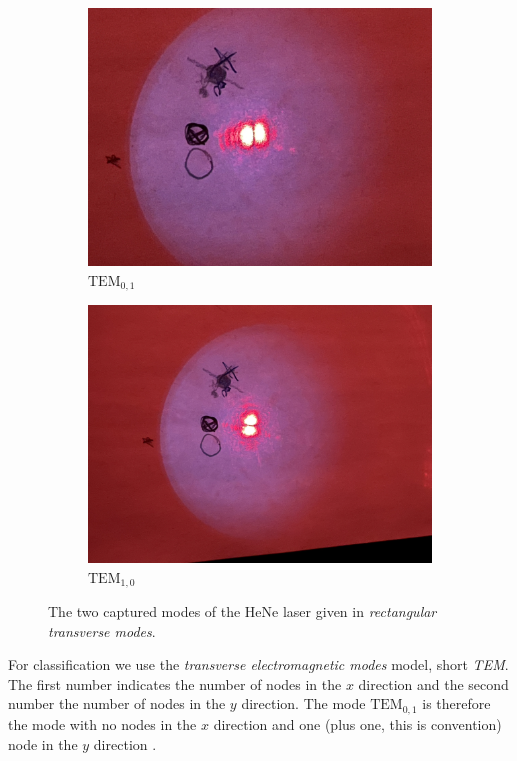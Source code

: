 \documentclass[../main.tex]{subfiles}
\begin{document}
    \begin{figure}[H]
        \centering
        \begin{subfigure}[b]{0.4\textwidth}
            \centering
            \includegraphics[angle=0,width=\textwidth]{Bilddateien/6/IMG_3497.jpeg}
            \caption{$\text{TEM}_{0,1}$}
            \label{fig:TEM_0_1}
        \end{subfigure}
        \begin{subfigure}[b]{0.4\textwidth}
            \centering
            \includegraphics[angle=180,width=\textwidth]{Bilddateien/6/IMG_3499.jpeg}
            \caption{$\text{TEM}_{1,0}$}
            \label{fig:TEM_1_0}
        \end{subfigure}
        \caption{The two captured modes of the HeNe laser given in \emph{rectangular transverse modes}.}
    \end{figure}
    For classification we use the \emph{transverse electromagnetic modes} model, short \emph{TEM}. The first number indicates the number of nodes in the $x$ direction and the second number the number of nodes in the $y$ direction. The mode $\text{TEM}_{0,1}$ is therefore the mode with no nodes in the $x$ direction and one (plus one, this is convention) node in the $y$ direction \cite[p. 13]{doc:NDYAGStudentManual}.
\end{document}
